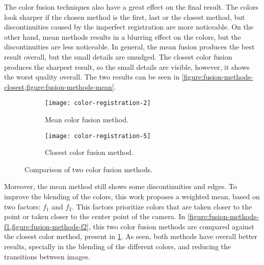 The color fusion techniques also have a great effect on the final result. The colors look sharper if the chosen method is the first, last or the closest method, but discontinuities caused by the imperfect registration are more noticeable. On the other hand, mean methods results in a blurring effect on the colors, but the discontinuities are less noticeable. In general, the mean fusion produces the best result overall, but the small details are smudged. The closest color fusion produces the sharpest result, so the small details are visible, however, it shows the worst quality overall. The two results can be seen in \cref{figure:fusion-methods-closest,figure:fusion-methods-mean}.

\begin{figure}[h]
    
    \centering
    \begin{subfigure}[t]{0.5\textwidth}
        \centering
        \texttt{[image: color-registration-2]}

        \caption{Mean color fusion method.}
        \label{figure:fusion-methods-mean}
    \end{subfigure}%
    \begin{subfigure}[t]{0.5\textwidth}
        \centering
        \texttt{[image: color-registration-5]}

        \caption{Closest color fusion method.}
        \label{figure:fusion-methods-closest}
    \end{subfigure}%

    \caption{Comparison of two color fusion methods.}
    \label{figure:fusion-methods-1}

\end{figure}

Moreover, the mean method still shows some discontinuities and edges. To improve the blending of the colors, this work proposes a weighted mean, based on two factors: $f_1$ and $f_2$. This factors prioritize colors that are taken closer to the point or taken closer to the center point of the camera. In \cref{figure:fusion-methods-f1,figure:fusion-methods-f2}, this two color fusion methods are compared against the closest color method, present in \cref{figure:fusion-methods-mean}. As seen, both methods have overall better results, specially in the blending of the different colors, and reducing the transitions between images.

